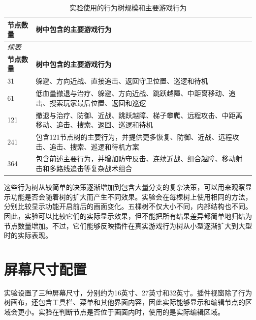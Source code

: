 \documentclass[11pt,a4paper,oneside,extrafontsizes]{memoir}
\begin{document}
\begin{center}
\small
\begin{longtable}{@{}p{} p{}@{}}
\caption{实验使用的行为树规模和主要游戏行为}\label{tab:auto-1}\\
\toprule
\textbf{节点数量} & \textbf{树中包含的主要游戏行为} \\
\midrule
\endfirsthead
\multicolumn{2}{l}{\small\itshape 续表}\\
\toprule
\textbf{节点数量} & \textbf{树中包含的主要游戏行为} \\
\midrule
\endhead
31 & 躲避、方向近战、直接追击、返回守卫位置、巡逻和待机 \\
61 & 低血量撤退与治疗、躲避、方向近战、跳跃越障、中距离移动、追击、搜索玩家最后位置、返回和巡逻 \\
121 & 撤退与治疗、防御、近战、跳跃越障、梯子攀爬、远程攻击、中距离移动、追击、搜索、返回、巡逻和待机 \\
241 & 包含121节点树的主要行为，并提供更多恢复、防御、近战、远程攻击、追击、搜索、巡逻和待机方案 \\
364 & 包含前述主要行为，并增加防守反击、连续近战、组合越障、移动射击和多路线追击等复杂战术组合 \\
\bottomrule
\end{longtable}
\end{center}

这些行为树从较简单的决策逐渐增加到包含大量分支的复杂决策，可以用来观察显示功能是否会随着树的扩大而产生不同效果。实验会在每棵树上使用相同的方法，分别比较显示功能开启前后的画面变化。五棵树不仅大小不同，内部结构也不同。因此，实验可以比较它们的实际显示效果，但不能把所有结果差异都简单地归结为节点数量增加。不过，它们能够反映插件在真实游戏行为树从小型逐渐扩大到大型时的实际表现。

\section{屏幕尺寸配置}

实验设置了三种屏幕尺寸，分别约为16英寸、27英寸和32英寸。插件视窗除了行为树画布，还包含工具栏、菜单和其他界面内容，因此实际能够显示和编辑节点的区域会更小。实验在判断节点是否位于画面内时，使用的是实际编辑区域。
\end{document}
